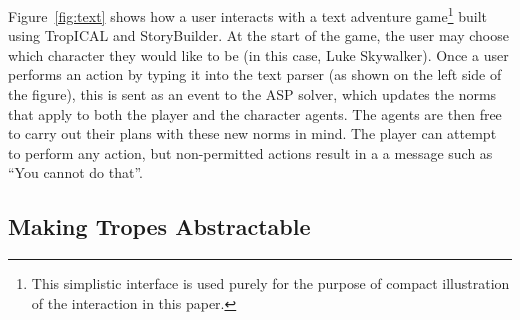 Figure~\ref{fig:text} shows how a user interacts with a text adventure game\footnote{This simplistic interface is used purely for the purpose of compact illustration of the interaction in this paper.} built using TropICAL and StoryBuilder. At the start of the game, the user may choose which character they would like to be (in this case, Luke Skywalker). Once a user performs an action by typing it into the text parser (as shown on the left side of the figure), this is sent as an event to the ASP solver, which updates the norms that apply to both the player and the character agents. The agents are then free to carry out their plans with these new norms in mind. The player can attempt to perform any action, but non-permitted actions result in a a message such as ``You cannot do that''.


\subsection{Making Tropes Abstractable}

